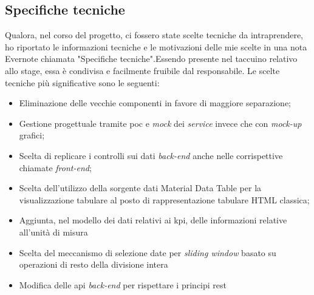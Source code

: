 \subsection{Specifiche tecniche}
Qualora, nel corso del progetto, ci fossero state scelte tecniche da intraprendere, ho riportato le informazioni tecniche e le motivazioni delle mie scelte in una nota Evernote chiamata "Specifiche tecniche".Essendo presente nel taccuino relativo allo stage, essa è condivisa e facilmente fruibile dal responsabile.
Le scelte tecniche più significative sono le seguenti:
\begin{itemize}
    \item Eliminazione delle vecchie componenti in favore di maggiore separazione;
    \item Gestione progettuale tramite \acrshort{poc} e \textit{mock} dei \textit{service} invece che con \textit{mock-up} grafici;
    \item Scelta di replicare i controlli sui dati \textit{back-end} anche nelle corrispettive chiamate \textit{front-end};
    \item Scelta dell'utilizzo della sorgente dati Material Data Table per la visualizzazione tabulare al posto di rappresentazione tabulare HTML classica;
    \item Aggiunta, nel modello dei dati relativi ai \acrshort{kpi}, delle informazioni relative all'unità di misura
    \item Scelta del meccanismo di selezione date per \textit{sliding window} basato su operazioni di resto della divisione intera
    \item Modifica delle \acrshort{api} \textit{back-end} per rispettare i principi \acrshort{rest}
\end{itemize}
